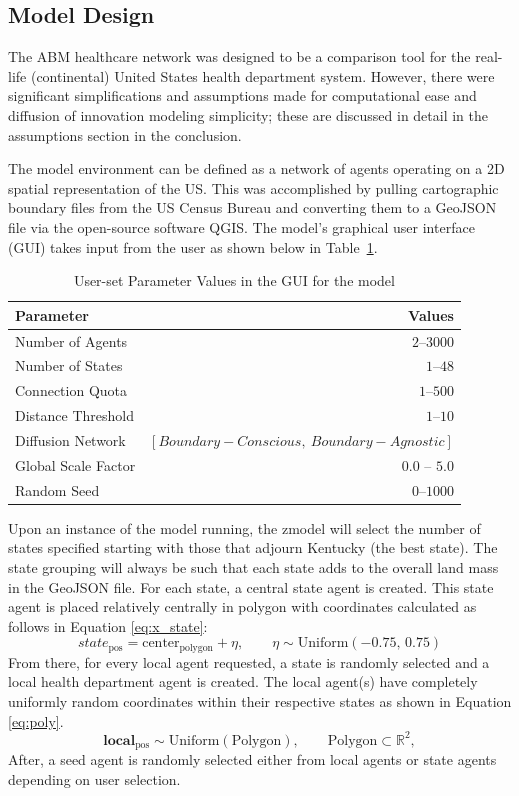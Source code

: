 \documentclass[12pt]{article}
\newcommand{\ra}[1]{\renewcommand{\arraystretch}{#1}} %
\begin{document}
\subsection{Model Design}
The ABM healthcare network was designed to be a comparison tool for the real-life (continental) United States health department system. However, there were significant simplifications and assumptions made for computational ease and diffusion of innovation modeling simplicity; these are discussed in detail in the assumptions section in the conclusion.
\par The model environment can be defined as a network of agents operating on a 2D spatial representation of the US. This was accomplished by pulling cartographic boundary files from the US Census Bureau and converting them to a GeoJSON file via the open-source software QGIS.  The model’s graphical user interface (GUI) takes input from the user as shown below in Table~\ref{tab:model-param}.
\begin{table}[h!]\centering
\ra{1.3}
\caption{User-set Parameter Values in the GUI for the model}
\begin{tabular}{@{}lr@{}}
\toprule
Parameter &  Values\\
\midrule
Number of Agents & $2$--$3000$\\
Number of States & $1$--$48$\\
Connection Quota & $1$--$500$\\
Distance Threshold & $1$--$10$\\
Diffusion Network & $[Boundary -Conscious,\ Boundary -Agnostic]$\\
Global Scale Factor & $0.0$ -- $5.0$\\
Random Seed & $0$--$1000$\\
\bottomrule
\end{tabular}
\label{tab:model-param}
\end{table}
\par Upon an instance of the model running, the zmodel will select the number of states specified starting with those that adjourn Kentucky (the best state). The state grouping will always be such that each state adds to the overall land mass in the GeoJSON file. For each state, a central state agent is created. This state agent is placed relatively centrally in polygon with coordinates calculated as follows in Equation \ref{eq:x_state}:
\begin{equation}
state_{\text{pos}} = \text{center}_{\text{polygon}} + \eta,
\qquad \eta \sim \mathrm{Uniform}(-0.75,\,0.75)
\label{eq:x_state}
\end{equation}
From there, for every local agent requested, a state is randomly selected and a local health department agent is created. The local agent(s) have completely uniformly random coordinates within their respective states as shown in Equation \ref{eq:poly}.
\begin{equation}
\mathbf{local}_{\text{pos}} \sim \mathrm{Uniform}(\text{Polygon}), 
\qquad\text{Polygon} \subset \mathbb{R}^2,
\label{eq:poly}
\end{equation}
After, a seed agent is randomly selected either from local agents or state agents depending on user selection.
\end{document}
